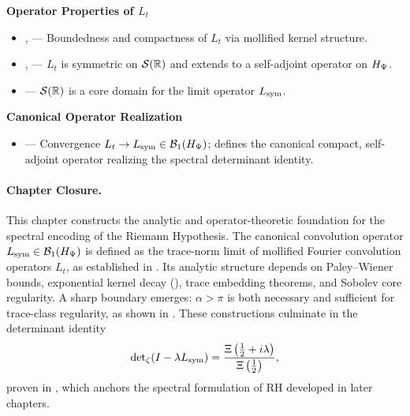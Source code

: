 \textbf{Operator Properties of \texorpdfstring{\( L_t \)}{Lt}}
\begin{itemize}
  \item {},  — Boundedness and compactness of \( L_t \) via mollified kernel structure.
  \item {},  — \( L_t \) is symmetric on \( \mathcal{S}(\mathbb{R}) \) and extends to a self-adjoint operator on \( H_{\Psi} \).
  \item {} — \( \mathcal{S}(\mathbb{R}) \) is a core domain for the limit operator \( L_{\mathrm{sym}} \).
\end{itemize}

\textbf{Canonical Operator Realization}
\begin{itemize}
  \item {} — Convergence \( L_t \to L_{\mathrm{sym}} \in \mathcal{B}_1(H_{\Psi}) \); defines the canonical compact, self-adjoint operator realizing the spectral determinant identity.
\end{itemize}

\paragraph{Chapter Closure.}
This chapter constructs the analytic and operator-theoretic foundation for the spectral encoding of the Riemann Hypothesis. The canonical convolution operator \( L_{\mathrm{sym}} \in \mathcal{B}_1(H_{\Psi}) \) is defined as the trace-norm limit of mollified Fourier convolution operators \( L_t \), as established in . Its analytic structure depends on Paley–Wiener bounds, exponential kernel decay (), trace embedding theorems, and Sobolev core regularity. A sharp boundary emerges: \( \alpha > \pi \) is both necessary and sufficient for trace-class regularity, as shown in . These constructions culminate in the determinant identity
\[
\det\nolimits_{\zeta}(I - \lambda L_{\mathrm{sym}})
= \frac{\Xi\left(\tfrac{1}{2} + i\lambda \right)}{\Xi\left(\tfrac{1}{2} \right)},
\]
proven in , which anchors the spectral formulation of RH developed in later chapters.
